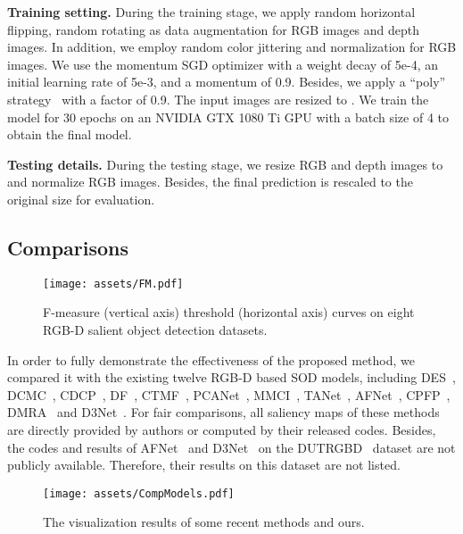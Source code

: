 \documentclass[runningheads]{llncs}
\begin{document}
\noindent\textbf{Training setting.} During the training stage, we apply random horizontal flipping, random rotating as data augmentation for RGB images and depth images. In addition, we employ random color jittering and normalization for RGB images. We use the momentum SGD optimizer with a weight decay of 5e-4, an initial learning rate of 5e-3, and a momentum of 0.9. Besides, we apply a ``poly'' strategy~\cite{poly} with a factor of 0.9. The input images are resized to . We train the model for 30 epochs on an NVIDIA GTX 1080 Ti GPU with a batch size of 4 to obtain the final model.

\noindent\textbf{Testing details.} During the testing stage, we resize RGB and depth images to  and normalize RGB images. Besides, the final prediction is rescaled to the original size for evaluation.

\subsection{Comparisons}

\begin{figure}[tp]
 \centering
 \texttt{[image: assets/FM.pdf]}
 \caption{F-measure (vertical axis) threshold (horizontal axis) curves on eight RGB-D salient object detection datasets.}
 \label{fig:fm}
\end{figure}

In order to fully demonstrate the effectiveness of the proposed method, we compared it with the existing twelve RGB-D based SOD models, including DES~\cite{DES}, DCMC~\cite{DCMC}, CDCP~\cite{CDCP}, DF~\cite{DF}, CTMF~\cite{CTMF}, PCANet~\cite{PCANet}, MMCI~\cite{MMCI}, TANet~\cite{TANet}, AFNet~\cite{AFNetRGBD}, CPFP~\cite{CPFP}, DMRA~\cite{DUTRGBD} and D3Net~\cite{SIP}. For fair comparisons, all saliency maps of these methods are directly provided by authors or computed by their released codes. Besides, the codes and results of AFNet~\cite{AFNetRGBD} and D3Net~\cite{SIP} on the DUTRGBD~\cite{DUTRGBD} dataset are not publicly available. Therefore, their results on this dataset are not listed.

\begin{figure}[t]
 \begin{center}
  \texttt{[image: assets/CompModels.pdf]}
  \caption{The visualization results of some recent methods and ours.}
  \label{fig:CompModels}
 \end{center}
\end{figure}
\end{document}
